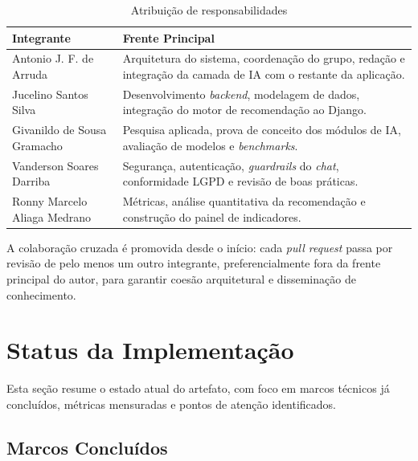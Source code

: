 \documentclass[monografia,abnt]{inf-ufg-modificado}
\newif\ifincluirstatus
\begin{document}
\begin{table}[H]
\centering
\caption{Atribuição de responsabilidades}
\label{tab:responsabilidades}
\begin{tabular}{@{} l p{10cm} @{}}
\toprule
\textbf{Integrante} & \textbf{Frente Principal} \\
\midrule
Antonio J. F. de Arruda & Arquitetura do sistema, coordenação do grupo, redação e integração da camada de IA com o restante da aplicação. \\
Jucelino Santos Silva & Desenvolvimento \textit{backend}, modelagem de dados, integração do motor de recomendação ao Django. \\
Givanildo de Sousa Gramacho & Pesquisa aplicada, prova de conceito dos módulos de IA, avaliação de modelos e \textit{benchmarks}. \\
Vanderson Soares Darriba & Segurança, autenticação, \textit{guardrails} do \textit{chat}, conformidade LGPD e revisão de boas práticas. \\
Ronny Marcelo Aliaga Medrano & Métricas, análise quantitativa da recomendação e construção do painel de indicadores. \\
\bottomrule
\end{tabular}
\end{table}

\noindent A colaboração cruzada é promovida desde o início: cada \textit{pull request} passa por revisão de pelo menos um outro integrante, preferencialmente fora da frente principal do autor, para garantir coesão arquitetural e disseminação de conhecimento.

\ifincluirstatus
\chapter{Status da Implementação}

Esta seção resume o estado atual do artefato, com foco em marcos técnicos já concluídos, métricas mensuradas e pontos de atenção identificados.

\section{Marcos Concluídos}
\end{document}
